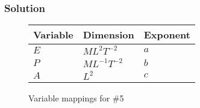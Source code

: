 \documentclass[12pt]{article}
\begin{document}
  \subsubsection*{Solution}
  \begin{figure}
    \centering
    \begin{tabularx}{0.5\textwidth}{XXX}
      Variable & Dimension & Exponent \\ \midrule
      $E$ & $ML^2T^{-2}$ & $a$ \\
      $P$ & $ML^{-1}T^{-2}$ & $b$ \\
      $A$ & $L^2$ & $c$ \\
    \end{tabularx}
    \caption{Variable mappings for \#5}
\label{fig:5-var-mappings}
  \end{figure}
\end{document}
